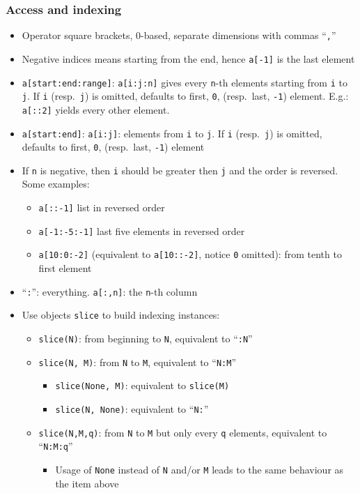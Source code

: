 \documentclass[a4paper,12pt,%
              final%
              ]{article}
\begin{document}
\subsubsection{Access and indexing}
\begin{itemize}
  \item Operator square brackets, 0-based, separate dimensions with commas ``\texttt{,}''
  \item Negative indices means starting from the end, hence \texttt{a[-1]} is the last element
  \item \verb|a[start:end:range]|: \verb|a[i:j:n]| gives every \texttt{n}-th elements starting from \texttt{i} to \texttt{j}. If \texttt{i} (resp.\ \texttt{j}) is omitted, defaults to first, \texttt{0}, (resp.\ last, \texttt{-1}) element. E.g.: \verb|a[::2]| yields every other element.
  \item \verb|a[start:end]|: \verb|a[i:j]|: elements from \texttt{i} to \texttt{j}. If \texttt{i} (resp.\ \texttt{j}) is omitted, defaults to first, \texttt{0}, (resp.\ last, \texttt{-1}) element
  \item If \texttt{n} is negative, then \texttt{i} should be greater then \texttt{j} and the order is reversed. Some examples:
    \begin{itemize}
      \item \verb|a[::-1]| list in reversed order
      \item \verb|a[-1:-5:-1]| last five elements in reversed order
      \item \verb|a[10:0:-2]| (equivalent to \verb|a[10::-2]|, notice \texttt{0} omitted): from tenth to first element
    \end{itemize}
  \item ``\verb|:|'': everything. \verb|a[:,n]|: the \texttt{n}-th column
  \item Use objects \texttt{slice} to build indexing instances:
    \begin{itemize}
      \item \texttt{slice(N)}: from beginning to \texttt{N}, equivalent to ``\texttt{:N}''
      \item \texttt{slice(N, M)}: from \texttt{N} to \texttt{M}, equivalent to ``\texttt{N:M}''
        \begin{itemize}
          \item \texttt{slice(None, M)}: equivalent to \texttt{slice(M)}
          \item \texttt{slice(N, None)}: equivalent to ``\texttt{N:}''
        \end{itemize}
      \item \texttt{slice(N,M,q)}: from \texttt{N} to \texttt{M} but only every \texttt{q} elements, equivalent to ``\texttt{N:M:q}''
        \begin{itemize}
          \item Usage of \texttt{None} instead of \texttt{N} and/or \texttt{M} leads to the same behaviour as the item above
        \end{itemize}
    \end{itemize}
\end{itemize}
\end{document}
